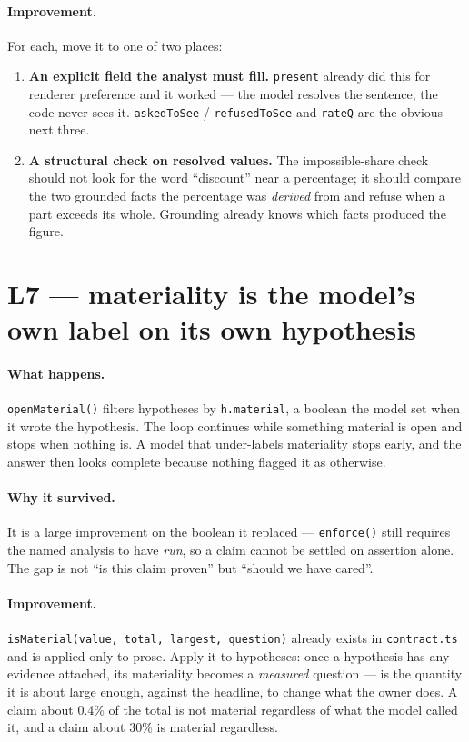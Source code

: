 \documentclass[11pt,a4paper]{report}
\newcommand{\file}[1]{\texttt{\small #1}}
\newcommand{\code}[1]{\texttt{\small #1}}
\begin{document}
\paragraph{Improvement.} For each, move it to one of two places:
\begin{enumerate}[leftmargin=*,itemsep=1pt]
\item \textbf{An explicit field the analyst must fill.} \code{present} already did this for
      renderer preference and it worked --- the model resolves the sentence, the code never sees
      it. \code{askedToSee} / \code{refusedToSee} and \code{rateQ} are the obvious next three.
\item \textbf{A structural check on resolved values.} The impossible-share check should not look
      for the word ``discount'' near a percentage; it should compare the two grounded facts the
      percentage was \emph{derived} from and refuse when a part exceeds its whole. Grounding
      already knows which facts produced the figure.
\end{enumerate}

\section{L7 --- materiality is the model's own label on its own hypothesis}

\paragraph{What happens.} \code{openMaterial()} filters hypotheses by \code{h.material}, a boolean
the model set when it wrote the hypothesis. The loop continues while something material is open and
stops when nothing is. A model that under-labels materiality stops early, and the answer then looks
complete because nothing flagged it as otherwise.

\paragraph{Why it survived.} It is a large improvement on the boolean it replaced ---
\code{enforce()} still requires the named analysis to have \emph{run}, so a claim cannot be settled
on assertion alone. The gap is not ``is this claim proven'' but ``should we have cared''.

\paragraph{Improvement.} \code{isMaterial(value, total, largest, question)} already exists in
\file{contract.ts} and is applied only to prose. Apply it to hypotheses: once a hypothesis has any
evidence attached, its materiality becomes a \emph{measured} question --- is the quantity it is
about large enough, against the headline, to change what the owner does. A claim about 0.4\% of the
total is not material regardless of what the model called it, and a claim about 30\% is material
regardless.
\end{document}
